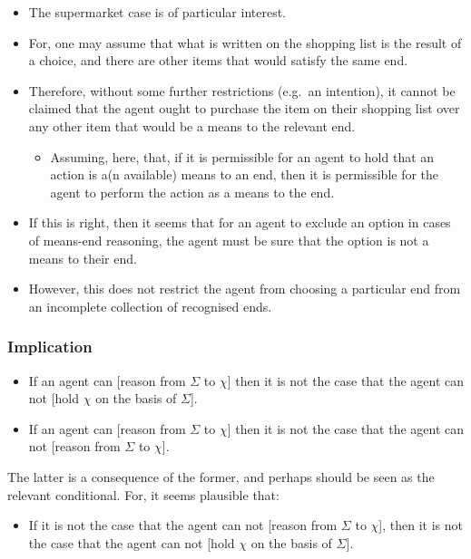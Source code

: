 \documentclass[10pt]{article}
\begin{document}
\begin{itemize}
\item The supermarket case is of particular interest.
\item For, one may assume that what is written on the shopping list is the result of a choice, and there are other items that would satisfy the same end.
\item Therefore, without some further restrictions (e.g.\ an intention), it cannot be claimed that the agent ought to purchase the item on their shopping list over any other item that would be a means to the relevant end.
  \begin{itemize}
  \item Assuming, here, that, if it is permissible for an agent to hold that an action is a(n available) means to an end, then it is permissible for the agent to perform the action as a means to the end.
  \end{itemize}
\item If this is right, then it seems that for an agent to exclude an option in cases of means-end reasoning, the agent must be sure that the option is not a means to their end.
\item However, this does not restrict the agent from choosing a particular end from an incomplete collection of recognised ends.
\end{itemize}

\subsubsection{Implication}
\label{sec:implication}

\begin{itemize}
\item If an agent can [reason from \(\Sigma\) to \(\chi\)] then it is not the case that the agent can not [hold \(\chi\) on the basis of \(\Sigma\)].
\item If an agent can [reason from \(\Sigma\) to \(\chi\)] then it is not the case that the agent can not [reason from \(\Sigma\) to \(\chi\)].
\end{itemize}

The latter is a consequence of the former, and perhaps should be seen as the relevant conditional.
For, it seems plausible that:

\begin{itemize}
\item If it is not the case that the agent can not [reason from \(\Sigma\) to \(\chi\)], then it is not the case that the agent can not [hold \(\chi\) on the basis of \(\Sigma\)].
\end{itemize}
\end{document}
